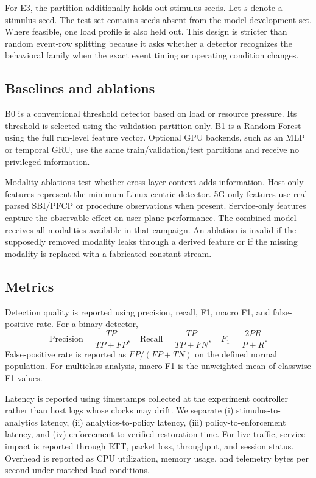 \documentclass[sigconf,review]{acmart}
\begin{document}
For E3, the partition additionally holds out stimulus seeds. Let $s$ denote a stimulus seed. The test set contains seeds absent from the model-development set. Where feasible, one load profile is also held out. This design is stricter than random event-row splitting because it asks whether a detector recognizes the behavioral family when the exact event timing or operating condition changes.

\subsection{Baselines and ablations}
B0 is a conventional threshold detector based on load or resource pressure. Its threshold is selected using the validation partition only. B1 is a Random Forest using the full run-level feature vector. Optional GPU backends, such as an MLP or temporal GRU, use the same train/validation/test partitions and receive no privileged information.

Modality ablations test whether cross-layer context adds information. Host-only features represent the minimum Linux-centric detector. 5G-only features use real parsed SBI/PFCP or procedure observations when present. Service-only features capture the observable effect on user-plane performance. The combined model receives all modalities available in that campaign. An ablation is invalid if the supposedly removed modality leaks through a derived feature or if the missing modality is replaced with a fabricated constant stream.

\subsection{Metrics}
Detection quality is reported using precision, recall, F1, macro F1, and false-positive rate. For a binary detector,
\begin{equation}
\mathrm{Precision}=\frac{TP}{TP+FP},\quad
\mathrm{Recall}=\frac{TP}{TP+FN},\quad
F_1=\frac{2PR}{P+R}.
\end{equation}
False-positive rate is reported as $FP/(FP+TN)$ on the defined normal population. For multiclass analysis, macro F1 is the unweighted mean of classwise F1 values.

Latency is reported using timestamps collected at the experiment controller rather than host logs whose clocks may drift. We separate (i) stimulus-to-analytics latency, (ii) analytics-to-policy latency, (iii) policy-to-enforcement latency, and (iv) enforcement-to-verified-restoration time. For live traffic, service impact is reported through RTT, packet loss, throughput, and session status. Overhead is reported as CPU utilization, memory usage, and telemetry bytes per second under matched load conditions.
\end{document}
